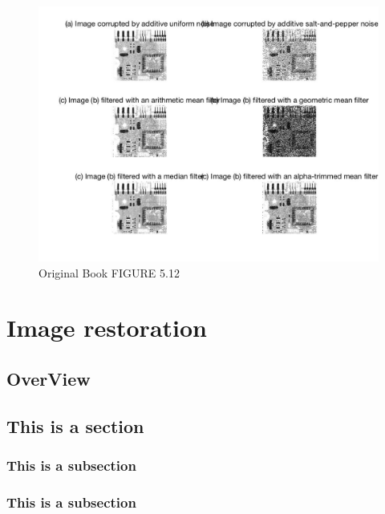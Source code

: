 \documentclass[11pt,oneside]{book}
\begin{document}
\begin{figure}[!htb]
   \centering  
   \includegraphics[width=1.0\textwidth]{images/4/order3.jpg}
   \caption{Original Book FIGURE 5.12}
\end{figure}
\newpage
\chapter{Image restoration}
\section{OverView}


\section{This is a section}
\subsection{This is a subsection}
\subsection{This is a subsection}
\end{document}
